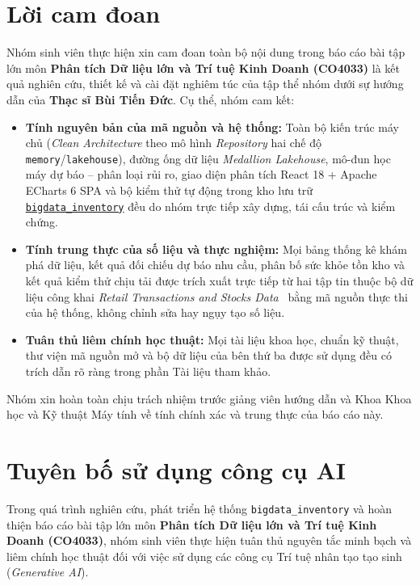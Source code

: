 \fancyfoot[C]{
	\ttfamily
	\thepage
}

\part*{Lời cam đoan}
Nhóm sinh viên thực hiện xin cam đoan toàn bộ nội dung trong báo cáo bài tập lớn môn \textbf{Phân tích Dữ liệu lớn và Trí tuệ Kinh Doanh (CO4033)} là kết quả nghiên cứu, thiết kế và cài đặt nghiêm túc của tập thể nhóm dưới sự hướng dẫn của \textbf{Thạc sĩ Bùi Tiến Đức}. Cụ thể, nhóm cam kết:
\begin{itemize}[topsep=4pt, itemsep=3pt]
	\item \textbf{Tính nguyên bản của mã nguồn và hệ thống:} Toàn bộ kiến trúc máy chủ (\textit{Clean Architecture} theo mô hình \textit{Repository} hai chế độ \texttt{memory}/\texttt{lakehouse}), đường ống dữ liệu \textit{Medallion Lakehouse}, mô-đun học máy dự báo -- phân loại rủi ro, giao diện phân tích React 18 + Apache ECharts 6 SPA và bộ kiểm thử tự động trong kho lưu trữ \href{https://github.com/qhuuwx/bigdata-hk262}{\texttt{bigdata\_inventory}} đều do nhóm trực tiếp xây dựng, tái cấu trúc và kiểm chứng.
	\item \textbf{Tính trung thực của số liệu và thực nghiệm:} Mọi bảng thống kê khám phá dữ liệu, kết quả đối chiếu dự báo nhu cầu, phân bố sức khỏe tồn kho và kết quả kiểm thử chịu tải được trích xuất trực tiếp từ hai tập tin thuộc bộ dữ liệu công khai \textit{Retail Transactions and Stocks Data}~\cite{smith2026retail} bằng mã nguồn thực thi của hệ thống, không chỉnh sửa hay ngụy tạo số liệu.
	\item \textbf{Tuân thủ liêm chính học thuật:} Mọi tài liệu khoa học, chuẩn kỹ thuật, thư viện mã nguồn mở và bộ dữ liệu của bên thứ ba được sử dụng đều có trích dẫn rõ ràng trong phần Tài liệu tham khảo.
\end{itemize}

\medskip

Nhóm xin hoàn toàn chịu trách nhiệm trước giảng viên hướng dẫn và Khoa Khoa học và Kỹ thuật Máy tính về tính chính xác và trung thực của báo cáo này.

\newpage\part*{Tuyên bố sử dụng công cụ AI}
Trong quá trình nghiên cứu, phát triển hệ thống \texttt{bigdata_inventory} và hoàn thiện báo cáo bài tập lớn môn \textbf{Phân tích Dữ liệu lớn và Trí tuệ Kinh Doanh (CO4033)}, nhóm sinh viên thực hiện tuân thủ nguyên tắc minh bạch và liêm chính học thuật đối với việc sử dụng các công cụ Trí tuệ nhân tạo tạo sinh (\textit{Generative AI}).

